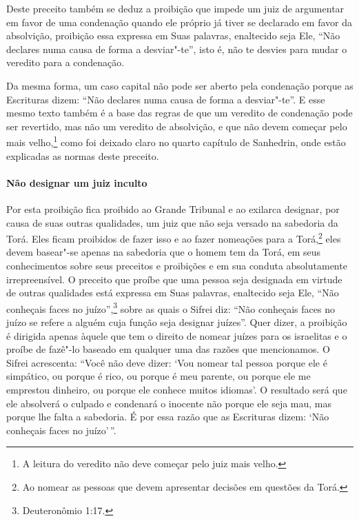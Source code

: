 \begin{multicols}{2}
Deste preceito também se deduz a proibição que impede um juiz de
argumentar em favor de uma condenação quando ele próprio já tiver se
declarado em favor da absolvição, proibição essa expressa em Suas
palavras, enaltecido seja Ele, ``Não declares numa causa de forma a
desviar"-te'', isto é, não te desvies para mudar o veredito para a
condenação.

Da mesma forma, um caso capital não pode ser aberto pela condenação
porque as Escrituras dizem: ``Não declares numa causa de forma a
desviar"-te''. E esse mesmo texto também é a base das regras de que um
veredito de condenação pode ser revertido, mas não um veredito de
absolvição, e que não devem começar pelo mais
velho,\footnote{A leitura do veredito não deve começar pelo juiz mais velho.} como foi deixado claro no quarto capítulo
de Sanhedrin\starr, onde estão explicadas as normas deste preceito.

\paragraph{Não designar um juiz inculto}

Por esta proibição fica proibido ao Grande Tribunal e ao exilarca\starr{}
designar, por causa de suas outras qualidades, um juiz que não seja
versado na sabedoria da Torá\starr. Eles ficam proibidos de fazer isso e ao
fazer nomeações para a Torá\starr,\footnote{Ao nomear as pessoas que devem apresentar decisões em questões da Torá\starr.} eles devem basear"-se
apenas na sabedoria que o homem tem da Torá\starr, em seus conhecimentos
sobre seus preceitos e proibições e em sua conduta absolutamente
irrepreensível. O preceito que proíbe que uma pessoa seja designada em
virtude de outras qualidades está expressa em Suas palavras, enaltecido
seja Ele, ``Não conheçais faces no juízo'',\footnote{Deuteronômio 1:17.} sobre
as quais o Sifrei\starr{} diz: ``Não conheçais faces no juízo se refere a alguém
cuja função seja designar juízes''. Quer dizer, a proibição é dirigida
apenas àquele que tem o direito de nomear juízes para os israelitas e o
proíbe de fazê"-lo baseado em qualquer uma das razões que mencionamos. O
Sifrei\starr{} acrescenta: ``Você não deve dizer: `Vou nomear tal pessoa porque
ele é simpático, ou porque é rico, ou porque é meu parente, ou porque
ele me emprestou dinheiro, ou porque ele conhece muitos idiomas'. O
resultado será que ele absolverá o culpado e condenará o inocente não
porque ele seja mau, mas porque lhe falta a sabedoria. É por essa razão
que as Escrituras dizem: `Não conheçais faces no juízo'\,''.


\end{multicols}
